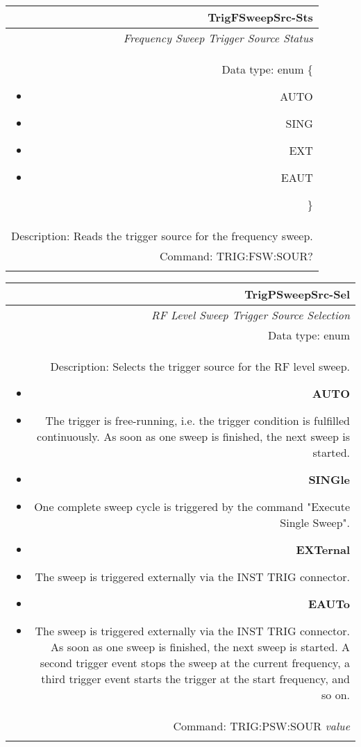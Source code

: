\documentclass[openany]{article}
\begin{document}
		\begin{tabular}{N}
			\hline
			\bfseries TrigFSweepSrc-Sts \\ \hline
			\emph{Frequency Sweep Trigger Source Status} \\
			Data type: enum \{\begin{itemize}[noitemsep]
				\small
				\item[] AUTO
				\item[] SING
				\item[] EXT
				\item[] EAUT
			\end{itemize}\} \\ 
			Description: Reads the trigger source for the frequency sweep. \\
			Command: TRIG:FSW:SOUR? \\
			\\

		\end{tabular}


		\begin{tabular}{N}
			\hline
			\bfseries TrigPSweepSrc-Sel \\ \hline
			\emph{RF Level Sweep Trigger Source Selection} \\
			Data type: enum \\   
			Description: Selects the trigger source for the RF level sweep.\begin{itemize}[noitemsep]
				\small
				\item[] \textbf{AUTO}
				\item[] The trigger is free-running, i.e. the trigger condition is fulfilled continuously. As soon as one sweep is finished, the next sweep is started.
                                \item[] \textbf{SINGle}
				\item[] One complete sweep cycle is triggered by the command "Execute Single Sweep".
				\item[] \textbf{EXTernal}
				\item[] The sweep is triggered externally via the INST TRIG connector.
                                \item[] \textbf{EAUTo}
				\item[] The sweep is triggered externally via the INST TRIG connector. As soon as one sweep is finished, the next sweep is started. A second trigger event stops the sweep at the current frequency, a third trigger event starts the trigger at the start frequency, and so on.

			\end{itemize} \\
			Command: TRIG:PSW:SOUR \emph{value} \\
			\\

		\end{tabular}
\end{document}
